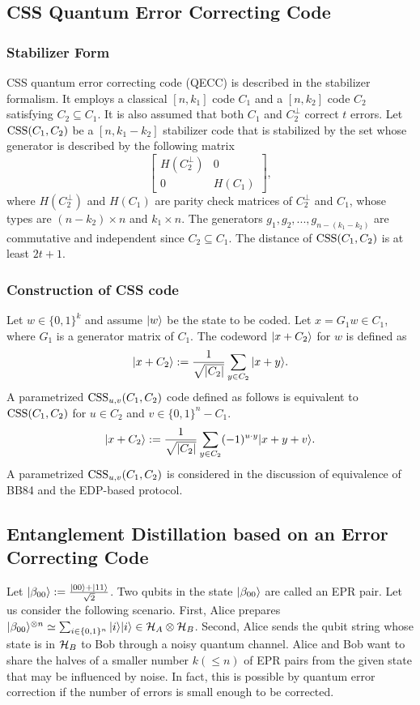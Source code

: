 \subsection{CSS Quantum Error Correcting Code}
\subsubsection*{Stabilizer Form}
CSS quantum error correcting code (QECC) \cite{CalderbankShor1996} is
described in
the stabilizer formalism. It employs a classical $[n,k_1]$ code $C_1$ and
a $[n,k_2]$ code $C_2$ satisfying $C_2 \subseteq C_1$.
It is also assumed that both $C_1$ and $C_2^\perp$ correct $t$ 
errors. Let $\mathrm{CSS}(C_1,C_2)$ be a $[n, k_1 - k_2]$ stabilizer code that
is stabilized
by the set whose generator is described by the following matrix
\[
 \begin{bmatrix}
    H(C_2^\perp) & 0\\
    0 & H(C_1)
  \end{bmatrix},
\]
where $H(C_2^\perp)$ and $H(C_1)$ are parity check matrices of
$C_2^\perp$ and $C_1$, whose types are $(n-k_2) \times n$ and $k_1
\times n$.
The generators $g_1,g_2,...,g_{n-(k_1 - k_2)}$ are commutative and 
independent since $C_2 \subseteq C_1$.
The distance of $\mathrm{CSS}(C_1,C_2)$ is at least $2t + 1$.

\subsubsection*{Construction of CSS code}
Let $w \in \{0,1\}^k$ and assume $|w\rangle$ be the state to be coded.
Let $x = G_1 w \in C_1$, where $G_1$ is
a generator matrix of $C_1$. The codeword $|x +
C_2\rangle$ for $w$ is defined as
\[
 |x + C_2\rangle := \frac{1}{\sqrt{|C_2|}}\sum_{y \in C_2} |x+y\rangle.
\]
A parametrized $\mathrm{CSS}_{u,v}(C_1,C_2)$ code defined as follows
is equivalent to $\mathrm{CSS}(C_1,C_2)$ for $u \in C_2$ and 
$v \in \{0,1\}^n - C_1$.
\[
 |x + C_2\rangle := \frac{1}{\sqrt{|C_2|}}\sum_{y \in C_2}(-1)^{u \cdot y}
 |x+y+v\rangle.
\]
A parametrized $\mathrm{CSS}_{u,v}(C_1,C_2)$ is considered in the discussion of
equivalence of BB84 and the EDP-based protocol.

\subsection{Entanglement Distillation based on an Error Correcting Code}
Let $|\beta_{00}\rangle := \frac{|00\rangle+|11\rangle}{\sqrt{2}}$. 
Two qubits in the state $|\beta_{00}\rangle$ are called an EPR pair.
Let us consider the following scenario. 
First, Alice prepares $|\beta_{00}\rangle^{\otimes n} \simeq
\sum_{i \in \{0,1\}^n}|i\rangle|i\rangle \in \mathcal{H}_A
\otimes \mathcal{H}_B$.
Second, Alice sends the qubit string whose state is
in $\mathcal{H}_B$ to Bob through a noisy quantum channel. 
Alice and Bob want to share the halves of 
a smaller number $k (\le n)$ of EPR pairs from the given state that
may be influenced by noise. In fact, this is possible by
quantum error correction if the number of errors is small enough to
be corrected.

